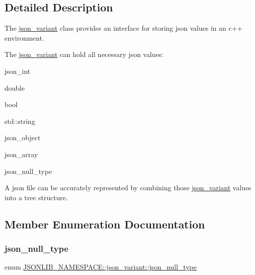 \subsection{Detailed Description}
The \hyperlink{classJSONLIB__NAMESPACE_1_1json__variant}{json\+\_\+variant} class provides an interface for storing json values in an c++ environment. 

The \hyperlink{classJSONLIB__NAMESPACE_1_1json__variant}{json\+\_\+variant} can hold all necessary json values\+:
\begin{DoxyItemize}
\item json\+\_\+int
\item double
\item bool
\item std\+::string
\item json\+\_\+object
\item json\+\_\+array
\item json\+\_\+null\+\_\+type
\end{DoxyItemize}

A json file can be accurately represented by combining those \hyperlink{classJSONLIB__NAMESPACE_1_1json__variant}{json\+\_\+variant} values into a tree structure. 

\subsection{Member Enumeration Documentation}
\mbox{\label{classJSONLIB__NAMESPACE_1_1json__variant_a1251d2c28258eeebea991ed0b39c3e0c}} 
\subsubsection{\texorpdfstring{json\+\_\+null\+\_\+type}{json\_null\_type}\hspace{0.1cm}{\footnotesize\ttfamily [1/2]}}
{\footnotesize\ttfamily enum \hyperlink{classJSONLIB__NAMESPACE_1_1json__variant_a1251d2c28258eeebea991ed0b39c3e0c}{J\+S\+O\+N\+L\+I\+B\+\_\+\+N\+A\+M\+E\+S\+P\+A\+C\+E\+::json\+\_\+variant\+::json\+\_\+null\+\_\+type}}



